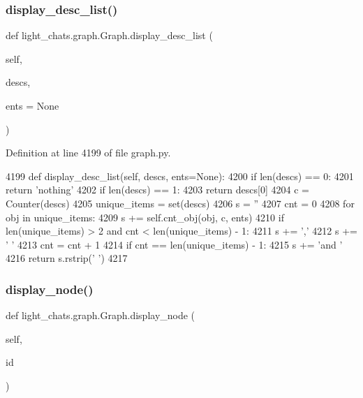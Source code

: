 \subsubsection{\texorpdfstring{display\+\_\+desc\+\_\+list()}{display\_desc\_list()}}
{\footnotesize\ttfamily def light\+\_\+chats.\+graph.\+Graph.\+display\+\_\+desc\+\_\+list (\begin{DoxyParamCaption}\item[{}]{self,  }\item[{}]{descs,  }\item[{}]{ents = {\ttfamily None} }\end{DoxyParamCaption})}



Definition at line 4199 of file graph.\+py.


\begin{DoxyCode}
4199     \textcolor{keyword}{def }display\_desc\_list(self, descs, ents=None):
4200         \textcolor{keywordflow}{if} len(descs) == 0:
4201             \textcolor{keywordflow}{return} \textcolor{stringliteral}{'nothing'}
4202         \textcolor{keywordflow}{if} len(descs) == 1:
4203             \textcolor{keywordflow}{return} descs[0]
4204         c = Counter(descs)
4205         unique\_items = set(descs)
4206         s = \textcolor{stringliteral}{''}
4207         cnt = 0
4208         \textcolor{keywordflow}{for} obj \textcolor{keywordflow}{in} unique\_items:
4209             s += self.cnt\_obj(obj, c, ents)
4210             \textcolor{keywordflow}{if} len(unique\_items) > 2 \textcolor{keywordflow}{and} cnt < len(unique\_items) - 1:
4211                 s += \textcolor{stringliteral}{','}
4212             s += \textcolor{stringliteral}{' '}
4213             cnt = cnt + 1
4214             \textcolor{keywordflow}{if} cnt == len(unique\_items) - 1:
4215                 s += \textcolor{stringliteral}{'and '}
4216         \textcolor{keywordflow}{return} s.rstrip(\textcolor{stringliteral}{' '})
4217 
\end{DoxyCode}
\mbox{\label{classlight__chats_1_1graph_1_1Graph_a34711f0bfabab728aa51d45bbde67580}} 
\subsubsection{\texorpdfstring{display\+\_\+node()}{display\_node()}}
{\footnotesize\ttfamily def light\+\_\+chats.\+graph.\+Graph.\+display\+\_\+node (\begin{DoxyParamCaption}\item[{}]{self,  }\item[{}]{id }\end{DoxyParamCaption})}



